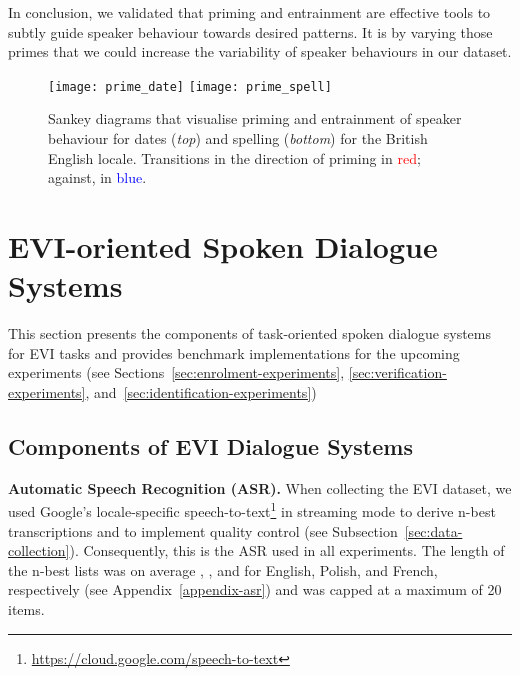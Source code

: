\documentclass[11pt]{article}
\newcommand{\sparagraph}[1]{\noindent\textbf{#1.}}
\begin{document}
{{
In conclusion,
we validated that priming and entrainment 
are effective tools to subtly guide speaker behaviour
towards desired patterns.
It is by varying those primes
that we could increase the variability of speaker behaviours in our dataset.
}

\begin{figure}[t]
\centering
\texttt{[image: prime\_date]}
\texttt{[image: prime\_spell]}
\caption{
    Sankey diagrams that visualise
    priming and entrainment of speaker behaviour
    for dates (\textit{top}) and spelling (\textit{bottom}) for the British English locale.
    Transitions in the direction of priming in \textcolor{red}{red}; against, in \textcolor{blue}{blue}.
}
\label{fig:priming}
\end{figure}

%
 



 

\section{EVI-oriented Spoken Dialogue Systems}
\label{sec:methods}

This section presents the components of task-oriented spoken dialogue systems for EVI tasks and provides benchmark implementations for the upcoming experiments
(see Sections~\ref{sec:enrolment-experiments}, \ref{sec:verification-experiments}, and~\ref{sec:identification-experiments})




\subsection{Components of EVI Dialogue Systems}
\label{sec:evi-shared-components}

\sparagraph{Automatic Speech Recognition (ASR)}
When collecting the EVI dataset,
we used Google's locale-specific speech-to-text\footnote{\url{https://cloud.google.com/speech-to-text}}
in streaming mode
to derive n-best transcriptions
and to implement quality control (see Subsection~\ref{sec:data-collection}).
Consequently, this is the ASR used in all experiments.
{The length of the n-best lists was on average , , and  for English, Polish, and French, respectively (see Appendix~\ref{appendix-asr})
and was capped at a maximum of 20 items.}

}
\end{document}

